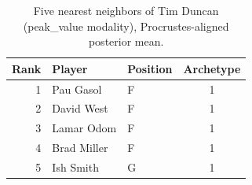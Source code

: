 \begin{table}[htbp]
  \centering\small
  \begin{tabular}{rllc}
    \toprule
    Rank & Player & Position & Archetype \\
    \midrule
    1 & Pau Gasol & F & 1 \\
    2 & David West & F & 1 \\
    3 & Lamar Odom & F & 1 \\
    4 & Brad Miller & F & 1 \\
    5 & Ish Smith & G & 1 \\
    \bottomrule
  \end{tabular}
  \caption{Five nearest neighbors of Tim Duncan (peak_value modality), Procrustes-aligned posterior mean.}
  \label{tab:Tim_Duncan_neighbors_peak_value}
\end{table}


